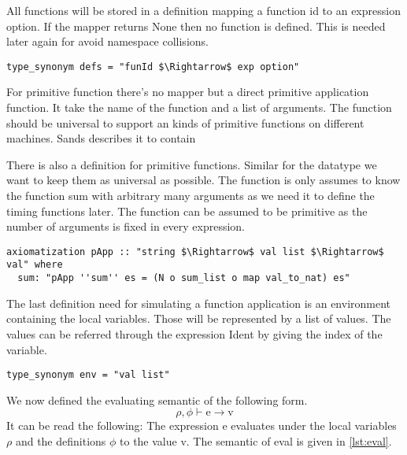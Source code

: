 All functions will be stored in a definition mapping a function id to an expression option.
If the mapper returns None then no function is defined.
This is needed later again for avoid namespace collisions.
\begin{lstlisting}[mathescape=true]
type_synonym defs = "funId $\Rightarrow$ exp option"
\end{lstlisting}

For primitive function there's no mapper but a direct primitive application function.
It take the name of the function and a list of arguments.
The function should be universal to support an kinds of primitive functions on different machines.
Sands describes it to contain

There is also a definition for primitive functions.
Similar for the datatype we want to keep them as universal as possible.
The function is only assumes to know the function sum with arbitrary many arguments as we need it to define
the timing functions later.
The function can be assumed to be primitive as the number of arguments is fixed in every expression.
\begin{lstlisting}[mathescape=true]
axiomatization pApp :: "string $\Rightarrow$ val list $\Rightarrow$ val" where
  sum: "pApp ''sum'' es = (N o sum_list o map val_to_nat) es"
\end{lstlisting}

The last definition need for simulating a function application is an environment containing the local variables.
Those will be represented by a list of values.
The values can be referred through the expression Ident by giving the index of the variable.
\begin{lstlisting}
type_synonym env = "val list"
\end{lstlisting}

We now defined the evaluating semantic of the following form.
\begin{equation*}
  \rho, \phi \vdash \text{e} \rightarrow \text{v}
\end{equation*}
It can be read the following: The expression $\text{e}$ evaluates under the local variables $\rho$ and the definitions $\phi$ to the value v. The semantic of eval is given in \ref{lst:eval}.

